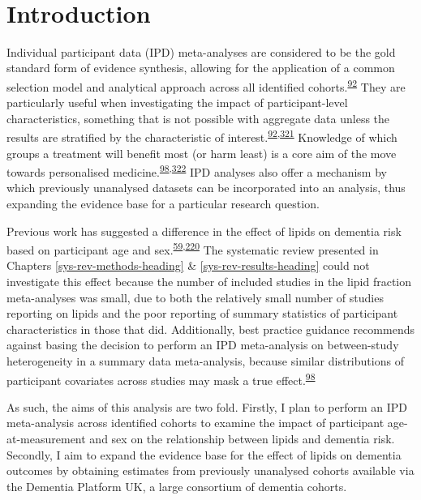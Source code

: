 \documentclass[a4paper, twoside]{templates/ociamthesis}
\begin{document}
~

\hypertarget{introduction-3}{%
\section{Introduction}\label{introduction-3}}

Individual participant data (IPD) meta-analyses are considered to be the gold standard form of evidence synthesis, allowing for the application of a common selection model and analytical approach across all identified cohorts.\textsuperscript{\protect\hyperlink{ref-riley2010}{92}} They are particularly useful when investigating the impact of participant-level characteristics, something that is not possible with aggregate data unless the results are stratified by the characteristic of interest.\textsuperscript{\protect\hyperlink{ref-riley2010}{92},\protect\hyperlink{ref-thompson2005}{321}} Knowledge of which groups a treatment will benefit most (or harm least) is a core aim of the move towards personalised medicine.\textsuperscript{\protect\hyperlink{ref-riley2020}{98},\protect\hyperlink{ref-hingorani2013}{322}}
IPD analyses also offer a mechanism by which previously unanalysed datasets can be incorporated into an analysis, thus expanding the evidence base for a particular research question.

Previous work has suggested a difference in the effect of lipids on dementia risk based on participant age and sex.\textsuperscript{\protect\hyperlink{ref-mielke2010}{59},\protect\hyperlink{ref-ancelin2013}{220}} The systematic review presented in Chapters \ref{sys-rev-methods-heading} \& \ref{sys-rev-results-heading} could not investigate this effect because the number of included studies in the lipid fraction meta-analyses was small, due to both the relatively small number of studies reporting on lipids and the poor reporting of summary statistics of participant characteristics in those that did. Additionally, best practice guidance recommends against basing the decision to perform an IPD meta-analysis on between-study heterogeneity in a summary data meta-analysis, because similar distributions of participant covariates across studies may mask a true effect.\textsuperscript{\protect\hyperlink{ref-riley2020}{98}}

As such, the aims of this analysis are two fold. Firstly, I plan to perform an IPD meta-analysis across identified cohorts to examine the impact of participant age-at-measurement and sex on the relationship between lipids and dementia risk. Secondly, I aim to expand the evidence base for the effect of lipids on dementia outcomes by obtaining estimates from previously unanalysed cohorts available via the Dementia Platform UK, a large consortium of dementia cohorts.
\end{document}

